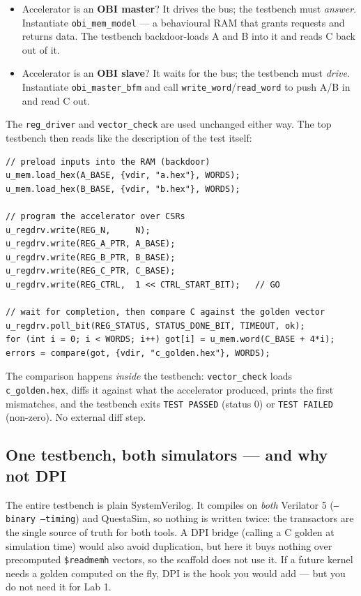 \documentclass[11pt]{article}
\newcommand{\code}[1]{\texttt{#1}}
\begin{document}
\begin{itemize}[nosep]
  \item Accelerator is an \textbf{OBI master}? It drives the bus; the testbench
        must \emph{answer}. Instantiate \code{obi\_mem\_model} --- a behavioural
        RAM that grants requests and returns data. The testbench backdoor-loads
        A and B into it and reads C back out of it.
  \item Accelerator is an \textbf{OBI slave}? It waits for the bus; the
        testbench must \emph{drive}. Instantiate \code{obi\_master\_bfm} and
        call \code{write\_word}/\code{read\_word} to push A/B in and read C out.
\end{itemize}

The \code{reg\_driver} and \code{vector\_check} are used unchanged either way.
The top testbench then reads like the description of the test itself:

\begin{lstlisting}[style=svlisting]
// preload inputs into the RAM (backdoor)
u_mem.load_hex(A_BASE, {vdir, "a.hex"}, WORDS);
u_mem.load_hex(B_BASE, {vdir, "b.hex"}, WORDS);

// program the accelerator over CSRs
u_regdrv.write(REG_N,     N);
u_regdrv.write(REG_A_PTR, A_BASE);
u_regdrv.write(REG_B_PTR, B_BASE);
u_regdrv.write(REG_C_PTR, C_BASE);
u_regdrv.write(REG_CTRL,  1 << CTRL_START_BIT);   // GO

// wait for completion, then compare C against the golden vector
u_regdrv.poll_bit(REG_STATUS, STATUS_DONE_BIT, TIMEOUT, ok);
for (int i = 0; i < WORDS; i++) got[i] = u_mem.word(C_BASE + 4*i);
errors = compare(got, {vdir, "c_golden.hex"}, WORDS);
\end{lstlisting}

The comparison happens \emph{inside} the testbench: \code{vector\_check} loads
\code{c\_golden.hex}, diffs it against what the accelerator produced, prints the
first mismatches, and the testbench exits \code{TEST PASSED} (status 0) or
\code{TEST FAILED} (non-zero). No external diff step.

\subsection{One testbench, both simulators --- and why not DPI}

The entire testbench is plain SystemVerilog. It compiles on \emph{both}
Verilator 5 (\code{--binary --timing}) and QuestaSim, so nothing is written
twice: the transactors are the single source of truth for both tools. A DPI
bridge (calling a C golden at simulation time) would also avoid duplication, but
here it buys nothing over precomputed \code{\$readmemh} vectors, so the scaffold
does not use it. If a future kernel needs a golden computed on the fly, DPI is
the hook you would add --- but you do not need it for Lab 1.
\end{document}
